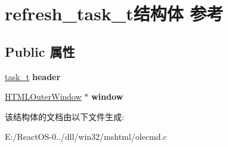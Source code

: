 \hypertarget{structrefresh__task__t}{}\section{refresh\+\_\+task\+\_\+t结构体 参考}
\label{structrefresh__task__t}
\subsection*{Public 属性}
\begin{DoxyCompactItemize}
\item 
\mbox{\label{structrefresh__task__t_a33f4c78df5994a772cd22a828e83019f}} 
\hyperlink{structtask__t}{task\+\_\+t} {\bfseries header}
\item 
\mbox{\label{structrefresh__task__t_a2964f548a07a957766ae5a2273ac09d6}} 
\hyperlink{struct_h_t_m_l_outer_window}{H\+T\+M\+L\+Outer\+Window} $\ast$ {\bfseries window}
\end{DoxyCompactItemize}


该结构体的文档由以下文件生成\+:\begin{DoxyCompactItemize}
\item 
E\+:/\+React\+O\+S-\/0../dll/win32/mshtml/olecmd.\+c\end{DoxyCompactItemize}
